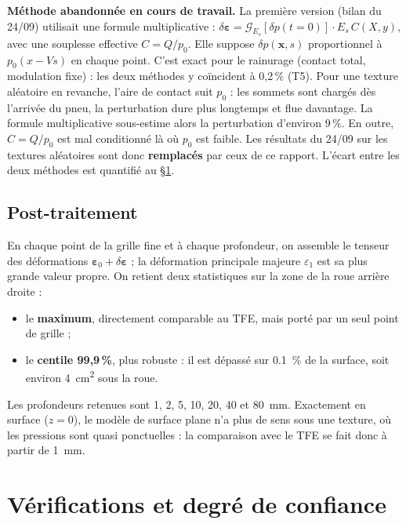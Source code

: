 \documentclass[11pt,a4paper]{article}
\renewcommand{\epsilon}{\varepsilon}
\begin{document}
\begin{alerte}
\textbf{Méthode abandonnée en cours de travail.} La première version (bilan du 24/09) utilisait
une formule multiplicative : $\delta\bm\epsilon=\mathcal G_{E_s}[\delta p(t=0)]\cdot E_s\,C(X,y)$,
avec une souplesse effective $C=Q/p_0$. Elle suppose $\delta p(\bm x,s)$ proportionnel à
$p_0(x-Vs)$ en chaque point. C'est exact pour le rainurage (contact total, modulation
fixe) : les deux méthodes y coïncident à 0,2\,\% (T5). Pour une texture aléatoire en revanche,
l'aire de contact suit $p_0$ : les sommets sont chargés dès l'arrivée du pneu, la perturbation dure
plus longtemps et flue davantage. La formule multiplicative sous-estime alors la perturbation
d'environ 9\,\%. En outre, $C=Q/p_0$ est mal conditionné là où $p_0$ est faible. Les résultats du
24/09 sur les textures aléatoires sont donc \textbf{remplacés} par ceux de ce rapport. L'écart entre les deux méthodes est quantifié au \S\ref{sec:verif}.
\end{alerte}

\subsection{Post-traitement}
En chaque point de la grille fine et à chaque profondeur, on assemble le tenseur des
déformations $\bm\epsilon_0+\delta\bm\epsilon$ ; la déformation principale majeure $\epsilon_1$
est sa plus grande valeur propre. On retient deux statistiques sur la zone de la roue arrière
droite :
\begin{itemize}[nosep]
\item le \textbf{maximum}, directement comparable au TFE, mais porté par un seul point de grille ;
\item le \textbf{centile 99,9\,\%}, plus robuste : il est dépassé sur \SI{0.1}{\%} de la surface,
      soit environ \SI{4}{cm^2} sous la roue.
\end{itemize}
Les profondeurs retenues sont 1, 2, 5, 10, 20, 40 et \SI{80}{mm}. Exactement en surface
($z=0$), le modèle de surface plane n'a plus de sens sous une texture, où les pressions sont
quasi ponctuelles : la comparaison avec le TFE se fait donc à partir de \SI{1}{mm}.

\section{Vérifications et degré de confiance}\label{sec:verif}

\end{document}
